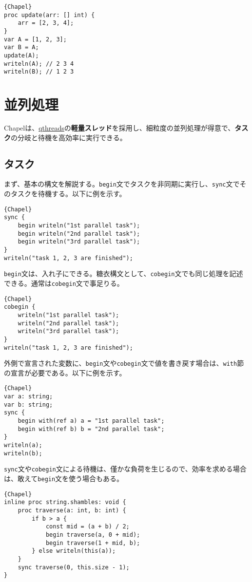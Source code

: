 \documentclass[10pt,a4paper]{book}
\begin{document}
\begin{Verbatim}{Chapel}
proc update(arr: [] int) {
	arr = [2, 3, 4];
}
var A = [1, 2, 3];
var B = A;
update(A);
writeln(A); // 2 3 4
writeln(B); // 1 2 3
\end{Verbatim}

\chapter{並列処理}

Chapelは、\href{https://github.com/qthreads/qthreads}{qthreads}の\textbf{軽量スレッド}を採用し、細粒度の並列処理が得意で、\textbf{タスク}の分岐と待機を高効率に実行できる。

\section{タスク}

まず、基本の構文を解説する。\texttt{begin}文でタスクを非同期に実行し、\texttt{sync}文でそのタスクを待機する。以下に例を示す。

\begin{Verbatim}{Chapel}
sync {
	begin writeln("1st parallel task");
	begin writeln("2nd parallel task");
	begin writeln("3rd parallel task");
}
writeln("task 1, 2, 3 are finished");
\end{Verbatim}

\texttt{begin}文は、入れ子にできる。糖衣構文として、\texttt{cobegin}文でも同じ処理を記述できる。通常は\texttt{cobegin}文で事足りる。

\begin{Verbatim}{Chapel}
cobegin {
	writeln("1st parallel task");
	writeln("2nd parallel task");
	writeln("3rd parallel task");
}
writeln("task 1, 2, 3 are finished");
\end{Verbatim}

外側で宣言された変数に、\texttt{begin}文や\texttt{cobegin}文で値を書き戻す場合は、\texttt{with}節の宣言が必要である。以下に例を示す。

\begin{Verbatim}{Chapel}
var a: string;
var b: string;
sync {
	begin with(ref a) a = "1st parallel task";
	begin with(ref b) b = "2nd parallel task";
}
writeln(a);
writeln(b);
\end{Verbatim}

\texttt{sync}文や\texttt{cobegin}文による待機は、僅かな負荷を生じるので、効率を求める場合は、敢えて\texttt{begin}文を使う場合もある。

\begin{Verbatim}{Chapel}
inline proc string.shambles: void {
	proc traverse(a: int, b: int) {
		if b > a {
			const mid = (a + b) / 2;
			begin traverse(a, 0 + mid);
			begin traverse(1 + mid, b);
		} else writeln(this(a));
	}
	sync traverse(0, this.size - 1);
}
\end{Verbatim}
\end{document}
